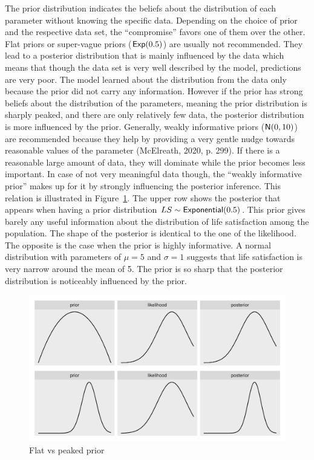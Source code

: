 \documentclass[a4, 12pt]{article}
\begin{document}
The prior distribution indicates the beliefs about the distribution of each parameter without knowing the specific data. Depending on the choice of prior and the respective data set, the ``compromise'' favors one of them over the other. Flat priors or super-vague priors (\({\sf Exp}(0.5)\)) are usually not recommended. They lead to a posterior distribution that is mainly influenced by the data which means that though the data set is very well described by the model, predictions are very poor. The model learned about the distribution from the data only because the prior did not carry any information. However if the prior has strong beliefs about the distribution of the parameters, meaning the prior distribution is sharply peaked, and there are only relatively few data, the posterior distribution is more influenced by the prior. Generally, weakly informative priors (\({\sf N}(0,10)\)) are recommended because they help by providing a very gentle nudge towards reasonable values of the parameter (McElreath, 2020, p. 299). If there is a reasonable large amount of data, they will dominate while the prior becomes less important. In case of not very meaningful data though, the ``weakly informative prior'' makes up for it by strongly influencing the posterior inference. This relation is illustrated in Figure~\ref{fig:flat-peaked}. The upper row shows the posterior that appears when having a prior distribution \(LS \sim {\sf Exponential}(0.5)\). This prior gives barely any useful information about the distribution of life satisfaction among the population. The shape of the posterior is identical to the one of the likelihood. The opposite is the case when the prior is highly informative. A normal distribution with parameters of \(\mu = 5\) and \(\sigma = 1\) suggests that life satisfaction is very narrow around the mean of 5. The prior is so sharp that the posterior distribution is noticeably influenced by the prior.

\begin{figure}[H]

{\centering \includegraphics[width=0.8\linewidth,]{../figures/flat_peaked} 

}

\caption{Flat vs peaked prior}\label{fig:flat-peaked}
\end{figure}
\end{document}
